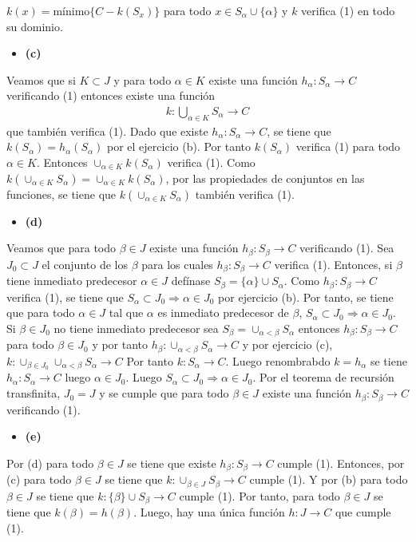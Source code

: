 \documentclass{article}
\begin{document}
$k(x)=\text{mínimo}\{C-k(S_x)\}$ para todo $x\in S_{\alpha}\cup\{\alpha\}$ y $k$ verifica (1) en todo su dominio.
\begin{itemize}
\item \bf(c)\rm
\end{itemize}
Veamos que si $K\subset J$ y para todo $\alpha\in K$ existe una función $h_{\alpha}:S_{\alpha}\rightarrow C$ verificando (1) entonces existe una función 
\begin{eqnarray}
k:\bigcup_{\alpha \in K}S_{\alpha}\rightarrow C\nonumber
\end{eqnarray}
que también verifica (1). Dado que existe $h_{\alpha}:S_{\alpha}\rightarrow C$, se tiene que $k(S_{\alpha})=h_{\alpha}(S_{\alpha})$ por el ejercicio (b). Por tanto $k(S_{\alpha})$ verifica (1) para todo $\alpha \in K$. Entonces $\cup_{\alpha \in K}k(S_{\alpha})$ verifica (1). Como $k(\cup_{\alpha \in K}S_{\alpha})=\cup_{\alpha \in K}k(S_{\alpha})$, por las propiedades de conjuntos en las funciones, se tiene que $k(\cup_{\alpha \in K}S_{\alpha})$ también verifica (1).
\begin{itemize}
\item \bf(d)\rm
\end{itemize}
Veamos que para todo $\beta \in J$ existe una función $h_{\beta}:S_{\beta}\rightarrow C$ verificando (1). Sea $J_0\subset J$ el conjunto de los $\beta$ para los cuales $h_{\beta}:S_{\beta}\rightarrow C$ verifica (1). Entonces, si $\beta$ tiene inmediato predecesor $\alpha\in J$ defínase $S_{\beta}=\{\alpha\}\cup S_{\alpha}$. Como $h_{\beta}:S_{\beta}\rightarrow C$ verifica (1), se tiene que  $S_{\alpha}\subset J_0\Rightarrow \alpha \in J_0$ por ejercicio (b). Por tanto, se tiene que para todo $\alpha \in J$ tal que $\alpha$ es inmediato predecesor de $\beta$, $S_{\alpha}\subset J_0\Rightarrow \alpha \in J_0$.
Si $\beta\in J_0$ no tiene inmediato predecesor sea $S_{\beta}=\cup_{\alpha<\beta}S_{\alpha}$ entonces $h_{\beta}:S_{\beta}\rightarrow C$ para todo $\beta\in J_0$ y por tanto $h_{\beta}:\cup_{\alpha<\beta} S_{\alpha}\rightarrow C$ y por ejercicio (c), $k:\cup_{\beta\in J_0}\cup_{\alpha<\beta} S_{\alpha}\rightarrow C$ Por tanto $k:S_{\alpha}\rightarrow C$. Luego renombrabdo $k=h_{\alpha}$ se tiene $h_{\alpha}:S_{\alpha}\rightarrow C$ luego $\alpha \in J_0$. Luego $S_{\alpha}\subset J_0\Rightarrow \alpha \in J_0$. Por el teorema de recursión transfinita, $J_0=J$ y se cumple que para todo $\beta \in J$ existe una función $h_{\beta}:S_{\beta}\rightarrow C$ verificando (1).
\begin{itemize}
\item \bf(e)\rm
\end{itemize}
Por (d) para todo $\beta\in J$ se tiene que existe $h_{\beta}:S_{\beta}\rightarrow C$ cumple (1). Entonces, por (c) para todo $\beta\in J$ se tiene que $k :\cup_{\beta\in J}S_{\beta}\rightarrow  C$ cumple (1). Y por (b) para todo $\beta\in J$ se tiene que $k :\{\beta\}\cup S_{\beta}\rightarrow  C$ cumple (1). Por tanto, para todo $\beta\in J$ se tiene que $k(\beta)=h(\beta)$. Luego, hay una única función  $h:J\rightarrow C$ que cumple (1).
\end{document}
